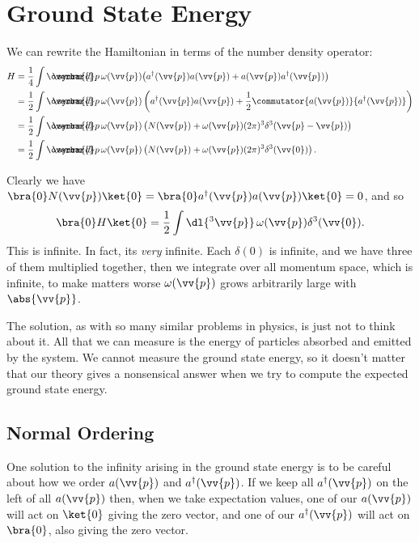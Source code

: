 \documentclass[fleqn]{NotesClass}
\newcommand{\hermit}{{\dagger}}
\newcommand{\dbar}[1][0.0]{\ThisStyle{\ensurestackMath{%
            \stackengine{#1\LMex}{\SavedStyle \symrm{d}}{\SavedStyle\overbar{}%
                \mkern2.25mu}{O}{r}{F}{F}{L}}}}
\newcommand{\invariantmeasure}[1]{%
    \mathchoice{\dbar #1}{\dbar #1}{\dbar[.05] #1}{\dbar[.06] #1}
}
\begin{document}
    \section{Ground State Energy}
    We can rewrite the Hamiltonian in terms of the number density operator:
    \begin{align}
        H &= \frac{1}{4} \int \invariantmeasure{p} \, \omega(\vv{p}) \big( a^\hermit(\vv{p}) a(\vv{p}) + a(\vv{p})a^\hermit(\vv{p}) \big)\\
        &= \frac{1}{2} \int \invariantmeasure{p} \, \omega(\vv{p}) \left( a^\hermit(\vv{p})a(\vv{p}) + \frac{1}{2} \commutator{a(\vv{p})}{a^\hermit(\vv{p})} \right)\\
        &= \frac{1}{2} \int \invariantmeasure{p} \, \omega(\vv{p}) \left( N(\vv{p}) + \omega(\vv{p})(2\pi)^3 \delta^3(\vv{p} - \vv{p}) \right)\\
        &= \frac{1}{2} \int \invariantmeasure{p} \, \omega(\vv{p}) \left( N(\vv{p}) + \omega(\vv{p})(2\pi)^3 \delta^3(\vv{0}) \right).
    \end{align}
    
    Clearly we have \(\bra{0}N(\vv{p})\ket{0} = \bra{0} a^\hermit(\vv{p})a(\vv{p})\ket{0} = 0\), and so
    \begin{equation}
        \bra{0}H\ket{0} = \frac{1}{2} \int \dl{^3\vv{p}} \, \omega(\vv{p}) \delta^3(\vv{0}).
    \end{equation}
    This is infinite.
    In fact, its \emph{very} infinite.
    Each \(\delta(0)\) is infinite, and we have three of them multiplied together, then we integrate over all momentum space, which is infinite, to make matters worse \(\omega(\vv{p})\) grows arbitrarily large with \(\abs{\vv{p}}\).
    
    The solution, as with so many similar problems in physics, is just not to think about it.
    All that we can measure is the energy of particles absorbed and emitted by the system.
    We cannot measure the ground state energy, so it doesn't matter that our theory gives a nonsensical answer when we try to compute the expected ground state energy.
    
    \subsection{Normal Ordering}
    One solution to the infinity arising in the ground state energy is to be careful about how we order \(a(\vv{p})\) and \(a^\hermit(\vv{p})\).
    If we keep all \(a^\hermit(\vv{p})\) on the left of all \(a(\vv{p})\) then, when we take expectation values, one of our \(a(\vv{p})\) will act on \(\ket{0}\) giving the zero vector, and one of our \(a^\hermit(\vv{p})\) will act on \(\bra{0}\), also giving the zero vector.
    
\end{document}
